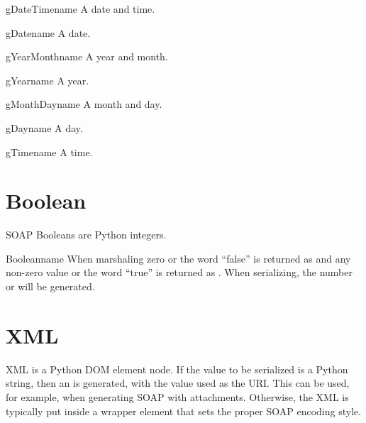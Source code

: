 \begin{classdesc}{gDateTime}{name}
A date and time.
\end{classdesc}

\begin{classdesc}{gDate}{name}
A date.
\end{classdesc}

\begin{classdesc}{gYearMonth}{name}
A year and month.
\end{classdesc}

\begin{classdesc}{gYear}{name}
A year.
\end{classdesc}

\begin{classdesc}{gMonthDay}{name}
A month and day.
\end{classdesc}

\begin{classdesc}{gDay}{name}
A day.
\end{classdesc}

\begin{classdesc}{gTime}{name}
A time.
\end{classdesc}

\section{Boolean}

SOAP Booleans are Python integers.

\begin{classdesc}{Boolean}{name}
When marshaling zero or the word ``false'' is returned as 
and any non-zero value or the word ``true'' is returned as .
When serializing, the number  or  will be generated.
\end{classdesc}

\section{XML}

XML is a Python DOM element node.
If the value to be serialized is a Python string, then an 
is generated, with the value used as the URI.
This can be used, for example, when generating SOAP with attachments.
Otherwise, the XML is typically put inside a wrapper element that sets
the proper SOAP encoding style.

